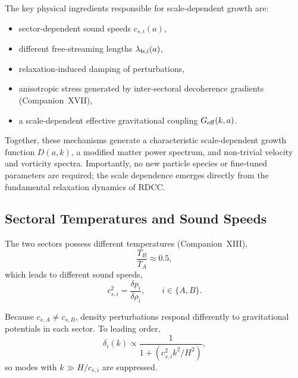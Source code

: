 \documentclass[11pt,a4paper]{article}
\begin{document}
The key physical ingredients responsible for scale-dependent growth are:

\begin{itemize}
\item sector-dependent sound speeds $c_{s,i}(a)$,
\item different free-streaming lengths $\lambda_{\rm fs,i}(a)$,
\item relaxation-induced damping of perturbations,
\item anisotropic stress generated by inter-sectoral decoherence gradients (Companion~XVII),
\item a scale-dependent effective gravitational coupling $G_{\rm eff}(k,a)$.
\end{itemize}

Together, these mechanisms generate a characteristic scale-dependent growth function
$D(a,k)$, a modified matter power spectrum, and non-trivial velocity and vorticity spectra.
Importantly, no new particle species or fine-tuned parameters are required; the scale
dependence emerges directly from the fundamental relaxation dynamics of RDCC.

\subsection{Sectoral Temperatures and Sound Speeds}

The two sectors possess different temperatures (Companion~XIII),
\begin{equation}
\frac{T_B}{T_A} \approx 0.5,
\end{equation}
which leads to different sound speeds,
\begin{equation}
c_{s,i}^2 = \frac{\delta p_i}{\delta\rho_i},
\qquad i \in \{A,B\}.
\end{equation}

Because $c_{s,A} \neq c_{s,B}$, density perturbations respond differently to gravitational
potentials in each sector. To leading order,
\begin{equation}
\delta_i(k) \propto
\frac{1}{1 + (c_{s,i}^2 k^2 / H^2)},
\end{equation}
so modes with $k \gg H/c_{s,i}$ are suppressed.

\end{document}
